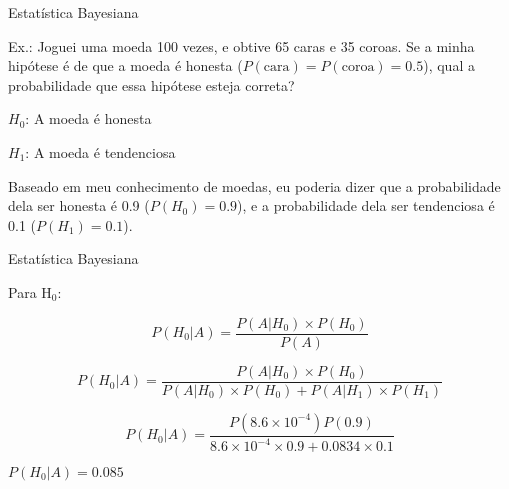 \documentclass{beamer}\usepackage[]{graphicx}\usepackage[]{color}
\begin{document}
\begin{frame}{Estatística Bayesiana}

\alert{Ex.:} Joguei uma moeda 100 vezes, e obtive 65 caras e 35 coroas. Se a minha hipótese é de que a moeda é honesta ($P(\text{cara}) = P(\text{coroa}) = 0.5$), qual a probabilidade que essa hipótese esteja correta?
\vfill

$H_0$: A moeda é honesta

$H_1$: A moeda é tendenciosa

\vfill
Baseado em meu conhecimento de moedas, eu poderia dizer que a probabilidade dela ser honesta é 0.9 ($P(H_0) = 0.9$), e a probabilidade dela ser tendenciosa é 0.1 ($P(H_1) = 0.1$). 
 
\end{frame}

\begin{frame}{Estatística Bayesiana}

Para H$_0$:

\begin{equation*}
P(H_0|A) = \frac{P(A|H_0) \times P(H_0)}{P(A)}
\end{equation*}

\begin{equation*}
P(H_0 | A) = \frac{P(A | H_0) \times P(H_0)}{P(A | H_0) \times P(H_0) + P(A | H_1) \times P(H_1)}
\end{equation*}

\begin{equation*}
P(H_0 | A) = \frac{P(\ensuremath{8.6\times 10^{-4}})P(0.9)}{\ensuremath{8.6\times 10^{-4}}\times 0.9 +0.0834 \times 0.1}
\end{equation*}

$P(H_0|A) = 0.085$
 
\end{frame}
\end{document}
